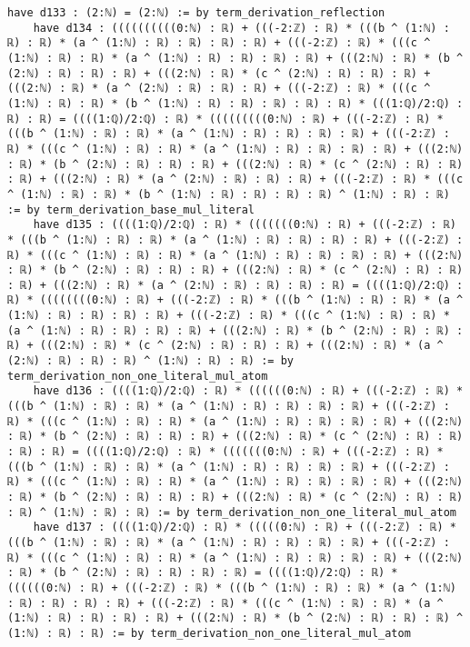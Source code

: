 \documentclass{article}
\begin{document}
\begin{tcolorbox}[colback=white!10, width=\linewidth]
\begin{lstlisting}[language=Lean4]
    have d133 : (2:ℕ) = (2:ℕ) := by term_derivation_reflection
    have d134 : ((((((((((0:ℕ) : ℝ) + (((-2:ℤ) : ℝ) * (((b ^ (1:ℕ) : ℝ) : ℝ) * (a ^ (1:ℕ) : ℝ) : ℝ) : ℝ) : ℝ) + (((-2:ℤ) : ℝ) * (((c ^ (1:ℕ) : ℝ) : ℝ) * (a ^ (1:ℕ) : ℝ) : ℝ) : ℝ) : ℝ) + (((2:ℕ) : ℝ) * (b ^ (2:ℕ) : ℝ) : ℝ) : ℝ) + (((2:ℕ) : ℝ) * (c ^ (2:ℕ) : ℝ) : ℝ) : ℝ) + (((2:ℕ) : ℝ) * (a ^ (2:ℕ) : ℝ) : ℝ) : ℝ) + (((-2:ℤ) : ℝ) * (((c ^ (1:ℕ) : ℝ) : ℝ) * (b ^ (1:ℕ) : ℝ) : ℝ) : ℝ) : ℝ) : ℝ) * (((1:ℚ)/2:ℚ) : ℝ) : ℝ) = ((((1:ℚ)/2:ℚ) : ℝ) * (((((((((0:ℕ) : ℝ) + (((-2:ℤ) : ℝ) * (((b ^ (1:ℕ) : ℝ) : ℝ) * (a ^ (1:ℕ) : ℝ) : ℝ) : ℝ) : ℝ) + (((-2:ℤ) : ℝ) * (((c ^ (1:ℕ) : ℝ) : ℝ) * (a ^ (1:ℕ) : ℝ) : ℝ) : ℝ) : ℝ) + (((2:ℕ) : ℝ) * (b ^ (2:ℕ) : ℝ) : ℝ) : ℝ) + (((2:ℕ) : ℝ) * (c ^ (2:ℕ) : ℝ) : ℝ) : ℝ) + (((2:ℕ) : ℝ) * (a ^ (2:ℕ) : ℝ) : ℝ) : ℝ) + (((-2:ℤ) : ℝ) * (((c ^ (1:ℕ) : ℝ) : ℝ) * (b ^ (1:ℕ) : ℝ) : ℝ) : ℝ) : ℝ) ^ (1:ℕ) : ℝ) : ℝ) := by term_derivation_base_mul_literal
    have d135 : ((((1:ℚ)/2:ℚ) : ℝ) * (((((((0:ℕ) : ℝ) + (((-2:ℤ) : ℝ) * (((b ^ (1:ℕ) : ℝ) : ℝ) * (a ^ (1:ℕ) : ℝ) : ℝ) : ℝ) : ℝ) + (((-2:ℤ) : ℝ) * (((c ^ (1:ℕ) : ℝ) : ℝ) * (a ^ (1:ℕ) : ℝ) : ℝ) : ℝ) : ℝ) + (((2:ℕ) : ℝ) * (b ^ (2:ℕ) : ℝ) : ℝ) : ℝ) + (((2:ℕ) : ℝ) * (c ^ (2:ℕ) : ℝ) : ℝ) : ℝ) + (((2:ℕ) : ℝ) * (a ^ (2:ℕ) : ℝ) : ℝ) : ℝ) : ℝ) = ((((1:ℚ)/2:ℚ) : ℝ) * ((((((((0:ℕ) : ℝ) + (((-2:ℤ) : ℝ) * (((b ^ (1:ℕ) : ℝ) : ℝ) * (a ^ (1:ℕ) : ℝ) : ℝ) : ℝ) : ℝ) + (((-2:ℤ) : ℝ) * (((c ^ (1:ℕ) : ℝ) : ℝ) * (a ^ (1:ℕ) : ℝ) : ℝ) : ℝ) : ℝ) + (((2:ℕ) : ℝ) * (b ^ (2:ℕ) : ℝ) : ℝ) : ℝ) + (((2:ℕ) : ℝ) * (c ^ (2:ℕ) : ℝ) : ℝ) : ℝ) + (((2:ℕ) : ℝ) * (a ^ (2:ℕ) : ℝ) : ℝ) : ℝ) ^ (1:ℕ) : ℝ) : ℝ) := by term_derivation_non_one_literal_mul_atom
    have d136 : ((((1:ℚ)/2:ℚ) : ℝ) * ((((((0:ℕ) : ℝ) + (((-2:ℤ) : ℝ) * (((b ^ (1:ℕ) : ℝ) : ℝ) * (a ^ (1:ℕ) : ℝ) : ℝ) : ℝ) : ℝ) + (((-2:ℤ) : ℝ) * (((c ^ (1:ℕ) : ℝ) : ℝ) * (a ^ (1:ℕ) : ℝ) : ℝ) : ℝ) : ℝ) + (((2:ℕ) : ℝ) * (b ^ (2:ℕ) : ℝ) : ℝ) : ℝ) + (((2:ℕ) : ℝ) * (c ^ (2:ℕ) : ℝ) : ℝ) : ℝ) : ℝ) = ((((1:ℚ)/2:ℚ) : ℝ) * (((((((0:ℕ) : ℝ) + (((-2:ℤ) : ℝ) * (((b ^ (1:ℕ) : ℝ) : ℝ) * (a ^ (1:ℕ) : ℝ) : ℝ) : ℝ) : ℝ) + (((-2:ℤ) : ℝ) * (((c ^ (1:ℕ) : ℝ) : ℝ) * (a ^ (1:ℕ) : ℝ) : ℝ) : ℝ) : ℝ) + (((2:ℕ) : ℝ) * (b ^ (2:ℕ) : ℝ) : ℝ) : ℝ) + (((2:ℕ) : ℝ) * (c ^ (2:ℕ) : ℝ) : ℝ) : ℝ) ^ (1:ℕ) : ℝ) : ℝ) := by term_derivation_non_one_literal_mul_atom
    have d137 : ((((1:ℚ)/2:ℚ) : ℝ) * (((((0:ℕ) : ℝ) + (((-2:ℤ) : ℝ) * (((b ^ (1:ℕ) : ℝ) : ℝ) * (a ^ (1:ℕ) : ℝ) : ℝ) : ℝ) : ℝ) + (((-2:ℤ) : ℝ) * (((c ^ (1:ℕ) : ℝ) : ℝ) * (a ^ (1:ℕ) : ℝ) : ℝ) : ℝ) : ℝ) + (((2:ℕ) : ℝ) * (b ^ (2:ℕ) : ℝ) : ℝ) : ℝ) : ℝ) = ((((1:ℚ)/2:ℚ) : ℝ) * ((((((0:ℕ) : ℝ) + (((-2:ℤ) : ℝ) * (((b ^ (1:ℕ) : ℝ) : ℝ) * (a ^ (1:ℕ) : ℝ) : ℝ) : ℝ) : ℝ) + (((-2:ℤ) : ℝ) * (((c ^ (1:ℕ) : ℝ) : ℝ) * (a ^ (1:ℕ) : ℝ) : ℝ) : ℝ) : ℝ) + (((2:ℕ) : ℝ) * (b ^ (2:ℕ) : ℝ) : ℝ) : ℝ) ^ (1:ℕ) : ℝ) : ℝ) := by term_derivation_non_one_literal_mul_atom

\end{lstlisting}
\end{tcolorbox}
\end{document}
